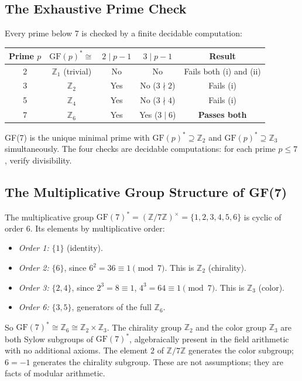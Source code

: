 \documentclass[11pt,openany]{book}
\theoremstyle{remark}
\begin{document}
\subsection*{The Exhaustive Prime Check}

Every prime below 7 is checked by a finite decidable computation:

\begin{center}
\begin{tabular}{ccccc}
\toprule
Prime $p$ & $\mathrm{GF}(p)^* \cong$ & $2 \mid p-1$ & $3 \mid p-1$ & Result \\
\midrule
2 & $\mathbb{Z}_1$ (trivial) & No  & No  & Fails both (i) and (ii) \\
3 & $\mathbb{Z}_2$           & Yes & No ($3 \nmid 2$) & Fails (i) \\
5 & $\mathbb{Z}_4$           & Yes & No ($3 \nmid 4$) & Fails (i) \\
7 & $\mathbb{Z}_6$           & Yes & Yes ($3 \mid 6$) & \textbf{Passes both} \\
\bottomrule
\end{tabular}
\end{center}

GF(7) is the unique minimal prime with $\mathrm{GF}(p)^* \supseteq \mathbb{Z}_2$ and
$\mathrm{GF}(p)^* \supseteq \mathbb{Z}_3$ simultaneously. The four checks are
decidable computations: for each prime $p \leq 7$, verify divisibility.

\subsection*{The Multiplicative Group Structure of GF(7)}

The multiplicative group $\mathrm{GF}(7)^* = (\mathbb{Z}/7\mathbb{Z})^\times =
\{1,2,3,4,5,6\}$ is cyclic of order 6. Its elements by multiplicative order:
\begin{itemize}[itemsep=2pt]
\item \emph{Order 1:} $\{1\}$ (identity).
\item \emph{Order 2:} $\{6\}$, since $6^2 = 36 \equiv 1 \pmod 7$. This is $\mathbb{Z}_2$ (chirality).
\item \emph{Order 3:} $\{2,4\}$, since $2^3 = 8 \equiv 1$, $4^3 = 64 \equiv 1 \pmod 7$. This is $\mathbb{Z}_3$ (color).
\item \emph{Order 6:} $\{3,5\}$, generators of the full $\mathbb{Z}_6$.
\end{itemize}
So $\mathrm{GF}(7)^* \cong \mathbb{Z}_6 \cong \mathbb{Z}_2 \times \mathbb{Z}_3$. The
chirality group $\mathbb{Z}_2$ and the color group $\mathbb{Z}_3$ are both Sylow
subgroups of $\mathrm{GF}(7)^*$, algebraically present in the field arithmetic with
no additional axioms. The element $2$ of $\mathbb{Z}/7\mathbb{Z}$ generates the
color subgroup; $6 = -1$ generates the chirality subgroup. These are not assumptions;
they are facts of modular arithmetic.
\end{document}
